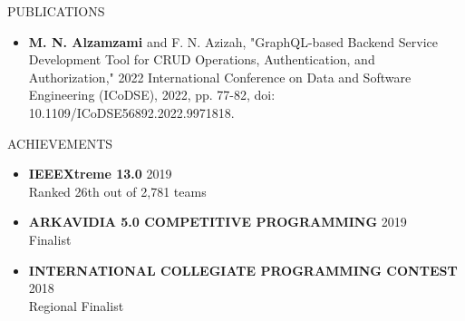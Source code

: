 \documentclass{resume} %
\begin{document}

\begin{rSection}{PUBLICATIONS}
\begin{itemize}
  \item \textbf{M. N. Alzamzami} and F. N. Azizah, "GraphQL-based Backend Service Development Tool for CRUD Operations, Authentication, and Authorization," 2022 International Conference on Data and Software Engineering (ICoDSE), 2022, pp. 77-82, doi: 10.1109/ICoDSE56892.2022.9971818.
\end{itemize}
\end{rSection}


\begin{rSection}{ACHIEVEMENTS}
\begin{itemize}
  \item \textbf{IEEEXtreme 13.0} \hfill 2019\\Ranked 26th out of 2,781 teams
  \item \textbf{ARKAVIDIA 5.0 COMPETITIVE PROGRAMMING} \hfill 2019\\Finalist
  \item \textbf{INTERNATIONAL COLLEGIATE PROGRAMMING CONTEST} \hfill 2018\\Regional Finalist
\end{itemize}
\end{rSection}
\end{document}
